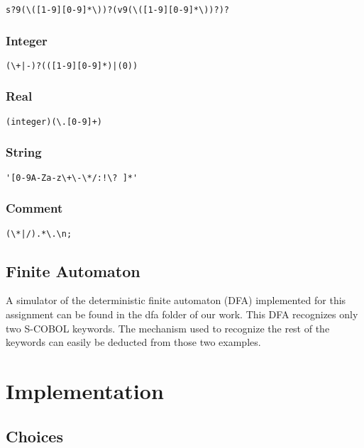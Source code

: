 \documentclass[a4paper,12pt]{article}
\begin{document}
\begin{verbatim}
s?9(\([1-9][0-9]*\))?(v9(\([1-9][0-9]*\))?)?
\end{verbatim}


\subsubsection{Integer}

\begin{verbatim}
(\+|-)?(([1-9][0-9]*)|(0))
\end{verbatim}


\subsubsection{Real}

\begin{verbatim}
(integer)(\.[0-9]+)
\end{verbatim}


\subsubsection{String}

\begin{verbatim}
'[0-9A-Za-z\+\-\*/:!\? ]*'
\end{verbatim}


\subsubsection{Comment}

\begin{verbatim}
(\*|/).*\.\n;
\end{verbatim}
\subsection{Finite Automaton}
A simulator of the deterministic finite automaton (DFA) implemented for this assignment can be found in the dfa  folder of our work. This DFA recognizes only two S-COBOL keywords. The mechanism used to recognize the rest of the keywords can easily be deducted from those two examples.
\newpage\cleardoublepage{}
\section{Implementation}
\subsection{Choices}
\end{document}
